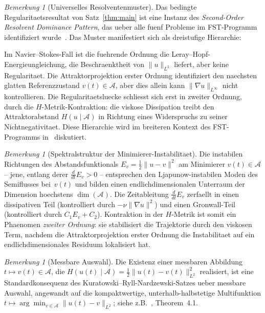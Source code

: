 \documentclass[12pt,a4paper]{article}
\theoremstyle{definition}
\theoremstyle{plain}
\theoremstyle{remark}
\newtheorem{remark}[definition]{Bemerkung}
\begin{document}
\begin{remark}[Universelles Resolventenmuster]\label{rem:universal-resolvent}
Das bedingte Regularitaetsresultat von Satz~\ref{thm:main} ist eine Instanz des
\emph{Second-Order Resolvent Dominance Pattern}, das ueber alle fuenf
Probleme im FST-Programm identifiziert wurde~\cite{FST-Unified2026}. Das Muster manifestiert sich als
dreistufige Hierarchie:

\noindent
Im Navier--Stokes-Fall ist die fuehrende Ordnung die Leray--Hopf-Energieungleichung,
die Beschraenktheit von $\|u\|_{L^2}$ liefert, aber keine Regularitaet.
Die Attraktorprojektion erster Ordnung identifiziert den naechsten glatten
Referenzzustand $v(t) \in \mathcal{A}$, aber dies allein kann
$\|\nabla u\|_{L^\infty}$ nicht kontrollieren. Die Regularitaetsluecke schliesst sich erst in zweiter
Ordnung, durch die $H$-Metrik-Kontraktion: die viskose Dissipation
treibt den Attraktorabstand $H(u \mid \mathcal{A})$ in Richtung eines
Widerspruchs zu seiner Nichtnegativitaet.  Diese Hierarchie wird im
breiteren Kontext des FST-Programms in~\cite{FST-Unified2026} diskutiert.
\end{remark}

\begin{remark}[Spektralstruktur der Minimierer-Instabilitaet]
\label{rem:resolvent-minimiser}
Die instabilen Richtungen des Abstandsfunktionals $E_v = \frac{1}{2}\|u-v\|^2$
am Minimierer $v(t) \in \mathcal{A}$ -- jene, entlang derer
$\frac{d}{dt}E_v > 0$ -- entsprechen den Ljapunow-instabilen Moden des
Semiflusses bei~$v(t)$ und bilden einen endlichdimensionalen Unterraum
der Dimension hoechstens $\dim(\mathcal{A})$. Die Zeitableitung $\frac{d}{dt}E_v$
zerfaellt in einen dissipativen Teil (kontrolliert durch $-\nu\|\nabla u\|^2$)
und einen Gronwall-Teil (kontrolliert durch $C_1 E_v + C_2$). Kontraktion in der
$H$-Metrik ist somit ein Phaenomen \emph{zweiter Ordnung}: sie stabilisiert die
Trajektorie durch den viskosen Term, nachdem die Attraktorprojektion erster Ordnung
die Instabilitaet auf ein endlichdimensionales Residuum lokalisiert hat.
\end{remark}

\begin{remark}[Messbare Auswahl]
\label{rem:selection}
Die Existenz einer messbaren Abbildung $t\mapsto v(t)\in\mathcal{A}$, die
$H(u(t)\mid\mathcal{A}) = \tfrac12\|u(t)-v(t)\|_{L^2}^2$ realisiert, ist eine Standardkonsequenz des Kuratowski--Ryll-Nardzewski-Satzes ueber messbare Auswahl, angewandt
auf die kompaktwertige, unterhalb-halbstetige Multifunktion
$t\mapsto \arg\min_{v\in\mathcal{A}}\|u(t)-v\|_{L^2}$; siehe z.B.\ \cite{Wagner1977}, Theorem~4.1.
\end{remark}
\end{document}
